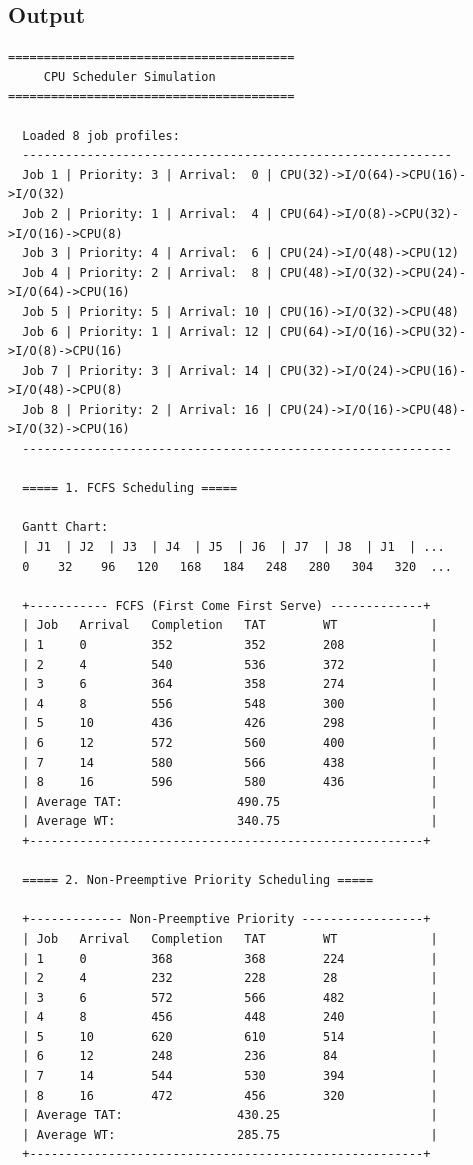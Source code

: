 \documentclass[11pt,a4paper]{article}
\begin{document}
\subsection*{Output}
\begin{outputbox}
\begin{lstlisting}[style=outputstyle]
========================================
     CPU Scheduler Simulation
========================================

  Loaded 8 job profiles:
  ------------------------------------------------------------
  Job 1 | Priority: 3 | Arrival:  0 | CPU(32)->I/O(64)->CPU(16)->I/O(32)
  Job 2 | Priority: 1 | Arrival:  4 | CPU(64)->I/O(8)->CPU(32)->I/O(16)->CPU(8)
  Job 3 | Priority: 4 | Arrival:  6 | CPU(24)->I/O(48)->CPU(12)
  Job 4 | Priority: 2 | Arrival:  8 | CPU(48)->I/O(32)->CPU(24)->I/O(64)->CPU(16)
  Job 5 | Priority: 5 | Arrival: 10 | CPU(16)->I/O(32)->CPU(48)
  Job 6 | Priority: 1 | Arrival: 12 | CPU(64)->I/O(16)->CPU(32)->I/O(8)->CPU(16)
  Job 7 | Priority: 3 | Arrival: 14 | CPU(32)->I/O(24)->CPU(16)->I/O(48)->CPU(8)
  Job 8 | Priority: 2 | Arrival: 16 | CPU(24)->I/O(16)->CPU(48)->I/O(32)->CPU(16)
  ------------------------------------------------------------

  ===== 1. FCFS Scheduling =====

  Gantt Chart:
  | J1  | J2  | J3  | J4  | J5  | J6  | J7  | J8  | J1  | ...
  0    32    96   120   168   184   248   280   304   320  ...

  +----------- FCFS (First Come First Serve) -------------+
  | Job   Arrival   Completion   TAT        WT             |
  | 1     0         352          352        208            |
  | 2     4         540          536        372            |
  | 3     6         364          358        274            |
  | 4     8         556          548        300            |
  | 5     10        436          426        298            |
  | 6     12        572          560        400            |
  | 7     14        580          566        438            |
  | 8     16        596          580        436            |
  | Average TAT:                490.75                     |
  | Average WT:                 340.75                     |
  +-------------------------------------------------------+

  ===== 2. Non-Preemptive Priority Scheduling =====

  +------------- Non-Preemptive Priority -----------------+
  | Job   Arrival   Completion   TAT        WT             |
  | 1     0         368          368        224            |
  | 2     4         232          228        28             |
  | 3     6         572          566        482            |
  | 4     8         456          448        240            |
  | 5     10        620          610        514            |
  | 6     12        248          236        84             |
  | 7     14        544          530        394            |
  | 8     16        472          456        320            |
  | Average TAT:                430.25                     |
  | Average WT:                 285.75                     |
  +-------------------------------------------------------+


\end{lstlisting}
\end{outputbox}
\end{document}
